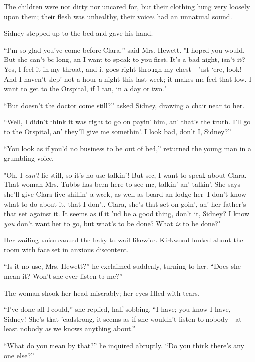 The children were not dirty nor uncared for, but their clothing hung
very loosely upon them; their flesh was unhealthy, their voices had an
unnatural sound.

Sidney stepped up to the bed and gave his hand.

``I'm so glad you've come before Clara,'' said Mrs. Hewett. "I hoped you
would. {}But she can't be long, an I want to speak to you first. It's a
bad night, isn't it? Yes, I feel it in my throat, and it goes right
through my chest---'ust `ere, look! And I haven't slep' not a hour a
night this last week; it makes me feel that low. I want to get to the
Orspital, if I can, in a day or two."

``But doesn't the doctor come still?'' asked Sidney, drawing a chair
near to her.

``Well, I didn't think it was right to go on payin' him, an' that's the
truth. I'll go to the Orspital, an' they'll give me somethin'. I look
bad, don't I, Sidney?''

``You look as if you'd no business to be out of bed,'' returned the
young man in a grumbling voice.

"Oh, I \emph{can't} lie still, so it's no use talkin'! But see, I want
to speak about Clara. That woman Mrs. Tubbs has been here to see me,
talkin' an' talkin'. She says she'll give Clara five shillin' a week, as
well as board an lodge her. I don't know what to do about it, that I
don't. Clara, she's that set on goin', an' her father's that set against
it. It seems as {}if it 'ud be a good thing, don't it, Sidney? I know
\emph{you} don't want her to go, but what's to be done? What \emph{is}
to be done?"

Her wailing voice caused the baby to wail likewise. Kirkwood looked
about the room with face set in anxious discontent.

``Is it no use, Mrs. Hewett?'' he exclaimed suddenly, turning to her.
``Does she mean it? Won't she ever listen to me?''

The woman shook her head miserably; her eyes filled with tears.

``I've done all I could,'' she replied, half sobbing. ``I have; you know
I have, Sidney! She's that 'eadstrong, it seems as if she wouldn't
listen to nobody---at least nobody as we knows anything about.''

``What do you mean by that?'' he inquired abruptly. ``Do you think
there's any one else?''

